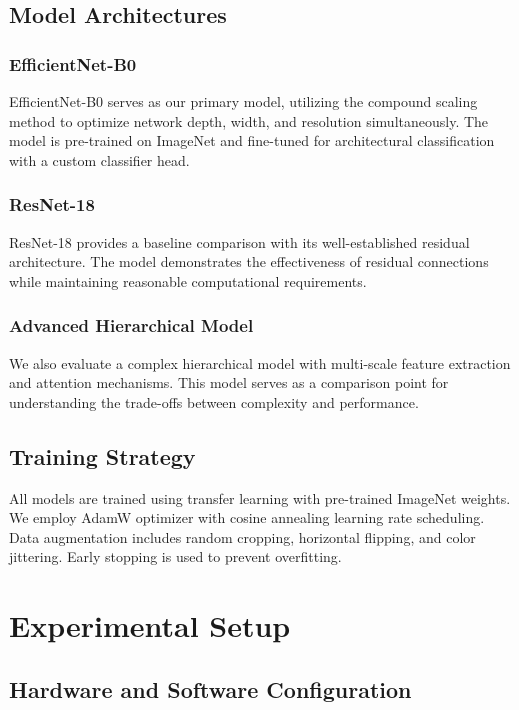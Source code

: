\documentclass[conference]{IEEEtran}
\begin{document}
\subsection{Model Architectures}

\subsubsection{EfficientNet-B0}

EfficientNet-B0 serves as our primary model, utilizing the compound scaling method to optimize network depth, width, and resolution simultaneously. The model is pre-trained on ImageNet and fine-tuned for architectural classification with a custom classifier head.

\subsubsection{ResNet-18}

ResNet-18 provides a baseline comparison with its well-established residual architecture. The model demonstrates the effectiveness of residual connections while maintaining reasonable computational requirements.

\subsubsection{Advanced Hierarchical Model}

We also evaluate a complex hierarchical model with multi-scale feature extraction and attention mechanisms. This model serves as a comparison point for understanding the trade-offs between complexity and performance.

\subsection{Training Strategy}

All models are trained using transfer learning with pre-trained ImageNet weights. We employ AdamW optimizer with cosine annealing learning rate scheduling. Data augmentation includes random cropping, horizontal flipping, and color jittering. Early stopping is used to prevent overfitting.

\section{Experimental Setup}

\subsection{Hardware and Software Configuration}
\end{document}
